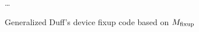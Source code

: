 \begin{figure}[H]
    \begin{algorithmic}
        \Switch{$\Mfixup$}
                \State {} 
            \EndCase
                \State {} 
            \EndCase
            \State \ldots
                \State {}
            \EndCase
        \EndSwitch
    \end{algorithmic}
    \caption{Generalized Duff's device fixup code based on $\Mfixup$}
    \label{fig:impl:fixup:duff:fixup-M_fixup}
\end{figure}
